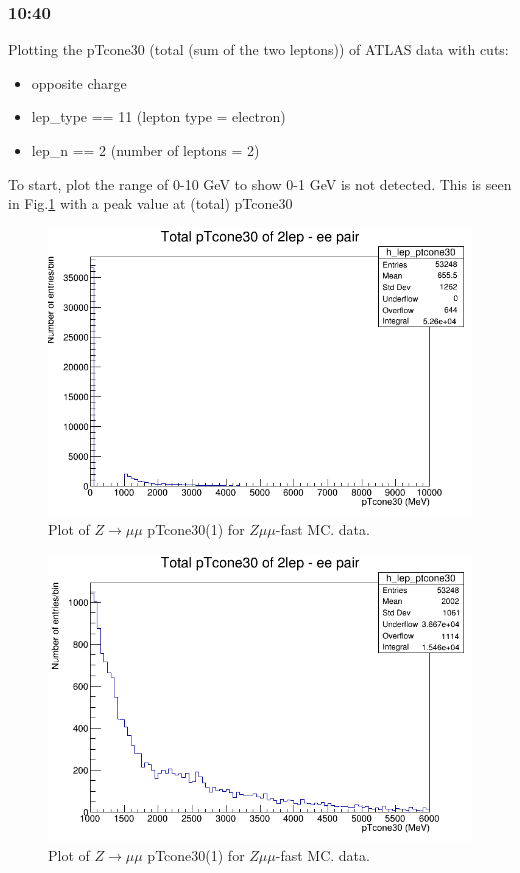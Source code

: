 \subsubsection*{10:40}
Plotting the pTcone30 (total (sum of the two leptons)) of ATLAS data with cuts:
\begin{itemize}
    \item opposite charge
    \item lep\_type == 11 (lepton type = electron)
    \item lep\_n == 2 (number of leptons = 2)
\end{itemize}
To start, plot the range of 0-10 GeV to show 0-1 GeV is not detected.  This is seen in Fig.\ref{fig:2lep_fast_ee-pair_pTcone30(total)_0-10GeV_16-02-21_10-50} with a peak value at (total) pTcone30 
\begin{figure}[h!]
    \centering
	\includegraphics[width=0.85\linewidth]{plots/16-02-2021/2lep_fast_ee-pair_pTcone30(total)_0-10GeV_16-02-21_10-50.png}
	\caption{Plot of  $Z \rightarrow \mu\mu$ pTcone30(1) for $Z\mu\mu$-fast MC.  data.}\label{fig:2lep_fast_ee-pair_pTcone30(total)_0-10GeV_16-02-21_10-50}
\end{figure}


\begin{figure}[h!]
    \centering
	\includegraphics[width=0.85\linewidth]{plots/16-02-2021/2lep_fast_ee-pair_pTcone30(total)_1-6GeV_16-02-21_10-59.png}
	\caption{Plot of  $Z \rightarrow \mu\mu$ pTcone30(1) for $Z\mu\mu$-fast MC.  data.}\label{fig:2lep_fast_ee-pair_pTcone30(total)_1-6GeV_16-02-21_10-59}
\end{figure}


